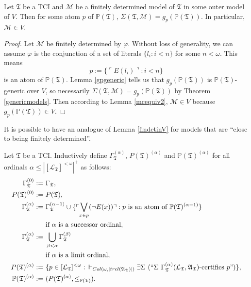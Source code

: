 \documentclass[12pt]{article}
\numberwithin{equation}{section}
\begin{document}
\begin{lem}\label{findetinV}
Let $\mathfrak{T}$ be a TCI and $\mathcal{M}$ be a finitely determined model of $\mathfrak{T}$ in some outer model of $V$. Then for some atom $p$ of $\mathbb{P}(\mathfrak{T})$, $\Sigma(\mathfrak{T}, \mathcal{M}) = g_p (\mathbb{P}(\mathfrak{T}))$. In particular, $\mathcal{M} \in V$.
\end{lem}

\begin{proof}
Let $\mathcal{M}$ be finitely determined by $\varphi$. Without loss of generality, we can assume $\varphi$ is the conjunction of a set of literals $\{l_i : i < n\}$ for some $n < \omega$. This means $$p := \{\ulcorner E(l_i) \urcorner : i < n\}$$ is an atom of $\mathbb{P}(\mathfrak{T})$. Lemma \ref{gpgeneric} tells us that $g_p (\mathbb{P}(\mathfrak{T}))$ is $\mathbb{P}(\mathfrak{T})$-generic over $V$, so necessarily $\Sigma(\mathfrak{T}, \mathcal{M}) = g_p (\mathbb{P}(\mathfrak{T}))$ by Theorem \ref{genericmodels}. Then according to Lemma \ref{mcequiv2}, $\mathcal{M} \in V$ because $g_p (\mathbb{P}(\mathfrak{T})) \in V$.
\end{proof}

It is possible to have an analogue of Lemma \ref{findetinV} for models that are ``close to being finitely determined''.

\begin{defi}\label{CB1}
Let $\mathfrak{T}$ be a TCI. Inductively define $\Gamma_{\mathfrak{T}}^{(\alpha)}$, $P(\mathfrak{T})^{(\alpha)}$ and $\mathbb{P}(\mathfrak{T})^{(\alpha)}$ for all ordinals $\alpha \leq |[\mathcal{L}_{\mathfrak{T}}]^{< \omega}|^+$ as follows:
\begin{align*}
    \Gamma_{\mathfrak{T}}^{(0)} := \ & \Gamma_{\mathfrak{T}} \text{,} \\
    P(\mathfrak{T})^{(0)} := \ & P(\mathfrak{T}) \text{,} \\
    \Gamma_{\mathfrak{T}}^{(\alpha)} := \ & \Gamma_{\mathfrak{T}}^{(\alpha - 1)} \cup \{\ulcorner \bigvee_{x \in p} (\neg E(x)) \urcorner : p \text{ is an atom of } \mathbb{P}(\mathfrak{T})^{(\alpha - 1)}\} \\
    & \text{if } \alpha \text{ is a successor ordinal,} \\
    \Gamma_{\mathfrak{T}}^{(\alpha)} := \ & \bigcup_{\beta < \alpha} \Gamma_{\mathfrak{T}}^{(\beta)} \\
    & \text{if } \alpha \text{ is a limit ordinal,} \\
    P(\mathfrak{T})^{(\alpha)} := \ & \{p \in [\mathcal{L}_{\mathfrak{T}}]^{< \omega} : \ \Vdash_{Col(\omega, |trcl(\mathfrak{A}_{\mathfrak{T}})|)} \exists \Sigma \ (``\Sigma \ \Gamma_{\mathfrak{T}}^{(\alpha)} (\mathcal{L}_{\mathfrak{T}}, \mathfrak{A}_{\mathfrak{T}})\text{-certifies } p")\} \text{,} \\
    \mathbb{P}(\mathfrak{T})^{(\alpha)} := \ & (P(\mathfrak{T})^{(\alpha)}, \leq_{\mathbb{P}(\mathfrak{T})}) \text{.}
\end{align*}
\end{defi}
\end{document}
